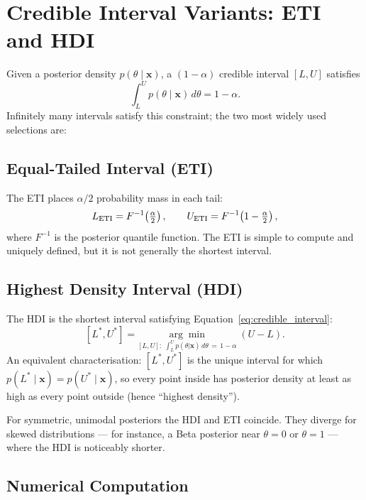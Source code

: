\section{Credible Interval Variants: ETI and HDI}\label{app:hdi}

Given a posterior density $p(\theta \mid \mathbf{x})$, a $(1-\alpha)$ credible interval
$[L, U]$ satisfies
\begin{equation}\label{eq:credible_interval}
  \int_L^U p(\theta \mid \mathbf{x})\,d\theta = 1 - \alpha.
\end{equation}
Infinitely many intervals satisfy this constraint; the two most widely used selections are:

\subsection*{Equal-Tailed Interval (ETI)}

The ETI places $\alpha/2$ probability mass in each tail:
\begin{equation}\label{eq:eti}
  L_{\rm ETI} = F^{-1}\!\left(\tfrac{\alpha}{2}\right), \qquad
  U_{\rm ETI} = F^{-1}\!\left(1 - \tfrac{\alpha}{2}\right),
\end{equation}
where $F^{-1}$ is the posterior quantile function. The ETI is simple to compute and
uniquely defined, but it is not generally the shortest interval.

\subsection*{Highest Density Interval (HDI)}

The HDI is the shortest interval satisfying Equation~\ref{eq:credible_interval}:
\begin{equation}\label{eq:hdi}
  [L^*, U^*] = \underset{[L,U]:\;\int_L^U p(\theta|\mathbf{x})\,d\theta\,=\,1-\alpha}{\arg\min}\;(U - L).
\end{equation}
An equivalent characterisation: $[L^*, U^*]$ is the unique interval for which
$p(L^* \mid \mathbf{x}) = p(U^* \mid \mathbf{x})$, so every point inside has posterior
density at least as high as every point outside (hence ``highest density'').

For symmetric, unimodal posteriors the HDI and ETI coincide. They diverge for skewed
distributions — for instance, a Beta posterior near $\theta = 0$ or $\theta = 1$ — where
the HDI is noticeably shorter.

\subsection*{Numerical Computation}

